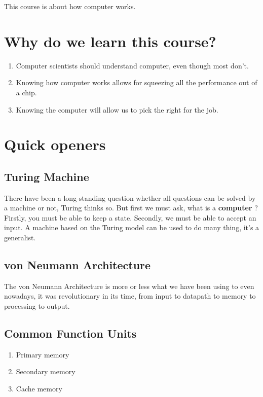 This course is about how computer works. 

\section{Why do we learn this course?}

\begin{enumerate}
    \item Computer scientists should understand computer, even though most don't. 
    \item Knowing how computer works allows for squeezing all the performance out of a chip.
    \item Knowing the computer will allow us to pick the right for the job. 
\end{enumerate}

\section{Quick openers}

\subsection{Turing Machine}

There have been a long-standing question whether all questions can be solved by a machine or not, Turing thinks so. But first we must ask, what is a \textbf{computer} ? Firstly, you must be able to keep a state. Secondly, we must be able to accept an input. A machine based on the Turing model can be used to do many thing, it's a generalist. 

\subsection{von Neumann Architecture}

The von Neumann Architecture is more or less what we have been using to even nowadays, it was revolutionary in its time, from input to datapath to memory to processing to output. 

\subsection{Common Function Units}

\begin{enumerate}
    \item Primary memory 
    \item Secondary memory 
    \item Cache memory
\end{enumerate}


